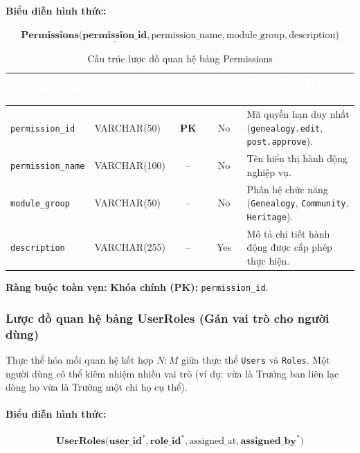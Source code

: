 \paragraph{Biểu diễn hình thức:}
\[
\textbf{Permissions}\big(
\underline{\textbf{permission\_id}}, \text{permission\_name}, \text{module\_group}, \text{description}
\big)
\]

\begin{table}[H]
    \centering
    \small
    \renewcommand{\arraystretch}{1.2}
    \begin{tabularx}{\textwidth}{p{3.0cm} p{2.6cm} c c X}
        \toprule
        \rowcolor{tableheader}\textcolor{white}{\textbf{Tên thuộc tính}} & \textcolor{white}{\textbf{Kiểu logic}} & \textcolor{white}{\textbf{Khóa}} & \textcolor{white}{\textbf{Null?}} & \textcolor{white}{\textbf{Diễn giải \& Ràng buộc tham chiếu}} \\
        \midrule
        \rowcolor{tablerowalt}
        \texttt{permission\_id} & VARCHAR(50) & \textcolor{pkcolor}{\textbf{PK}} & No & Mã quyền hạn duy nhất (\texttt{genealogy.edit}, \texttt{post.approve}). \\
        \texttt{permission\_name} & VARCHAR(100) & -- & No & Tên hiển thị hành động nghiệp vụ. \\
        \rowcolor{tablerowalt}
        \texttt{module\_group} & VARCHAR(50) & -- & No & Phân hệ chức năng (\texttt{Genealogy}, \texttt{Community}, \texttt{Heritage}). \\
        \texttt{description} & VARCHAR(255) & -- & Yes & Mô tả chi tiết hành động được cấp phép thực hiện. \\
        \bottomrule
    \end{tabularx}
    \caption{Cấu trúc lược đồ quan hệ bảng Permissions}
    \label{tab:schema_permissions}
\end{table}

\noindent\textbf{Ràng buộc toàn vẹn:} \textbf{Khóa chính (PK):} \texttt{permission\_id}.

\subsubsection{Lược đồ quan hệ bảng UserRoles (Gán vai trò cho người dùng)}
Thực thể hóa mối quan hệ kết hợp $N:M$ giữa thực thể \texttt{Users} và \texttt{Roles}. Một người dùng có thể kiêm nhiệm nhiều vai trò (ví dụ: vừa là Trưởng ban liên lạc dòng họ vừa là Trưởng một chi họ cụ thể).

\paragraph{Biểu diễn hình thức:}
\[
\textbf{UserRoles}\big(
\underline{\textbf{user\_id}}^*, \underline{\textbf{role\_id}}^*, \text{assigned\_at}, \textbf{assigned\_by}^*
\big)
\]


